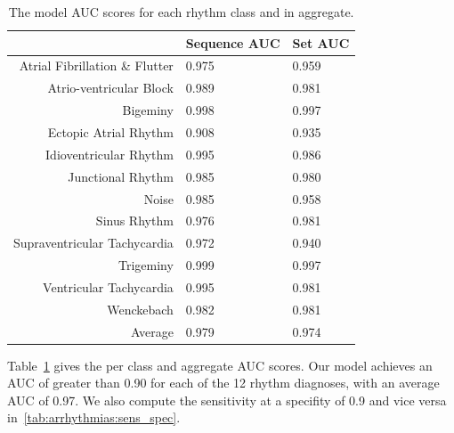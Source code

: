 \begin{table}
\centering
\begin{small}
\begin{tabular}{r l l}
\toprule
                               & Sequence AUC & Set AUC \\
\midrule
Atrial Fibrillation \& Flutter & 0.975 & 0.959 \\
Atrio-ventricular Block        & 0.989 & 0.981 \\
Bigeminy                       & 0.998 & 0.997 \\
Ectopic Atrial Rhythm          & 0.908 & 0.935 \\
Idioventricular Rhythm         & 0.995 & 0.986 \\
Junctional Rhythm              & 0.985 & 0.980 \\
Noise                          & 0.985 & 0.958 \\
Sinus Rhythm                   & 0.976 & 0.981 \\
Supraventricular Tachycardia   & 0.972 & 0.940 \\
Trigeminy                      & 0.999 & 0.997 \\
Ventricular Tachycardia        & 0.995 & 0.981 \\
Wenckebach                     & 0.982 & 0.981 \\
\midrule
   Average                     & 0.979               & 0.974 \\
\bottomrule
\end{tabular}
\end{small}
\caption{The model AUC scores for each rhythm class and in aggregate.}
\label{tab:arrhythmias:model_auc}
\end{table}

Table~\ref{tab:arrhythmias:model_auc} gives the per class and aggregate AUC
scores. Our model achieves an AUC of greater than 0.90 for each of the 12
rhythm diagnoses, with an average AUC of 0.97. We also compute the sensitivity
at a specifity of 0.9 and vice versa in~\ref{tab:arrhythmias:sens_spec}.

